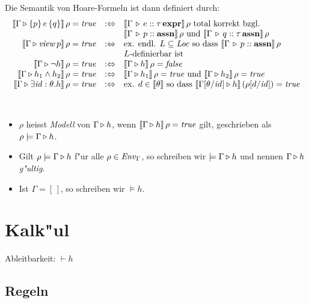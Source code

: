 \documentclass[12pt,a4paper,bigheadings]{scrartcl}
\newcommand{\semantic}[1]{\ensuremath{\llbracket#1\rrbracket}}
\newcommand{\assn}{\ensuremath{\mathbf{assn}}}
\newcommand{\atype}[1]{#1\,\assn}
\newcommand{\bexpr}{\ensuremath{\mathbf{expr}}}
\newcommand{\etype}[1]{#1\,\bexpr}
\newcommand{\view}[1]{\ensuremath{\app{\name{view}}{#1}}}
\begin{document}
\noindent
Die Semantik von Hoare-Formeln ist dann definiert durch:
\[\begin{array}{rcl}
  \semantic{\Tjh{\Gamma}{\triple{p}{e}{q}}}\,\rho = \true
  & :\Leftrightarrow &
  \semantic{\Tj{\Gamma}{e}{\etype{\tau}}}\,\rho \text{ total korrekt bzgl. } \\
  && \semantic{\Tj{\Gamma}{p}{\assn}}\,\rho \text{ und } \semantic{\Tj{\Gamma}{q}{\atype{\tau}}}\,\rho
  \\
  \semantic{\Tjh{\Gamma}{\view{p}}}\,\rho = \true
  & :\Leftrightarrow &
  \text{ex. endl. } L \subseteq \Loc \text{ so dass } \semantic{\Tj{\Gamma}{p}{\assn}}\,\rho \\
  && \text{$L$-definierbar ist}
  \\
  \semantic{\Tjh{\Gamma}{\neg h}}\,\rho = \true
  & :\Leftrightarrow &
  \semantic{\Tjh{\Gamma}{h}}\,\rho = \false
  \\
  \semantic{\Tjh{\Gamma}{h_1 \wedge h_2}}\,\rho = \true
  & :\Leftrightarrow &
  \semantic{\Tjh{\Gamma}{h_1}}\,\rho = \true \text{ und }
  \semantic{\Tjh{\Gamma}{h_2}}\,\rho = \true
  \\
  \semantic{\Tjh{\Gamma}{\exists \id:\theta.h}}\,\rho = \true
  & :\Leftrightarrow &
  \text{ex. } d \in \semantic{\theta} \text{ so dass }
  \semantic{\Tjh{\Gamma[\theta/\id]}{h}}\,(\rho[d/\id])=\true
\end{array}\]

\pagebreak[3]
\begin{definition}[Modell] \
  \begin{itemize}
    \item $\rho$ heisst {\em Modell} von $\Gamma \triangleright h$, wenn $\semantic{\Tjh{\Gamma}{h}}\,\rho = \true$
          gilt, geschrieben als $\rho \models \Gamma \triangleright h$.
    \item Gilt $\rho \models \Gamma \triangleright h$ f"ur alle $\rho\in{\text{\it Env\/}}_\Gamma$, so schreiben wir
          $\models \Gamma \triangleright h$ und nennen  $\Gamma \triangleright h$ {\em g"ultig}.
    \item Ist $\Gamma = [\,]$, so schreiben wir $\models h$.
  \end{itemize}
\end{definition}


\section{Kalk"ul}

Ableitbarkeit: $\vdash h$

\subsection{Regeln}
\end{document}
